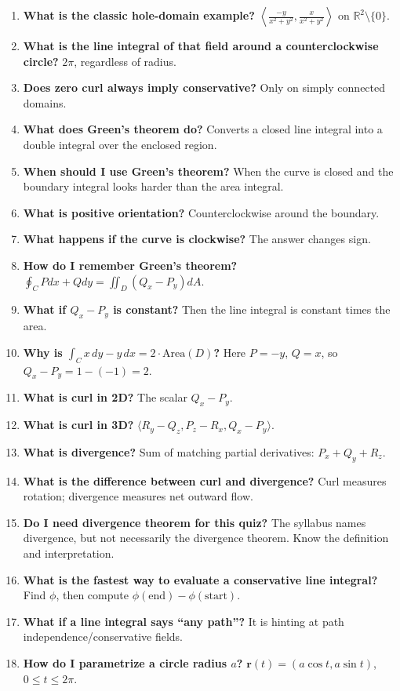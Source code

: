 \documentclass[11pt]{article}
\newcommand{\R}{\mathbb{R}}
\begin{document}
\begin{enumerate}
\item \textbf{What is the classic hole-domain example?} $\left\langle \frac{-y}{x^2+y^2},\frac{x}{x^2+y^2}\right\rangle$ on $\R^2\setminus\{0\}$.
\item \textbf{What is the line integral of that field around a counterclockwise circle?} $2\pi$, regardless of radius.
\item \textbf{Does zero curl always imply conservative?} Only on simply connected domains.
\item \textbf{What does Green's theorem do?} Converts a closed line integral into a double integral over the enclosed region.
\item \textbf{When should I use Green's theorem?} When the curve is closed and the boundary integral looks harder than the area integral.
\item \textbf{What is positive orientation?} Counterclockwise around the boundary.
\item \textbf{What happens if the curve is clockwise?} The answer changes sign.
\item \textbf{How do I remember Green's theorem?} $\oint_C Pdx+Qdy=\iint_D(Q_x-P_y)dA$.
\item \textbf{What if $Q_x-P_y$ is constant?} Then the line integral is constant times the area.
\item \textbf{Why is $\int_C x\,dy-y\,dx=2\cdot\text{Area}(D)$?} Here $P=-y$, $Q=x$, so $Q_x-P_y=1-(-1)=2$.
\item \textbf{What is curl in 2D?} The scalar $Q_x-P_y$.
\item \textbf{What is curl in 3D?} $\langle R_y-Q_z,P_z-R_x,Q_x-P_y\rangle$.
\item \textbf{What is divergence?} Sum of matching partial derivatives: $P_x+Q_y+R_z$.
\item \textbf{What is the difference between curl and divergence?} Curl measures rotation; divergence measures net outward flow.
\item \textbf{Do I need divergence theorem for this quiz?} The syllabus names divergence, but not necessarily the divergence theorem. Know the definition and interpretation.
\item \textbf{What is the fastest way to evaluate a conservative line integral?} Find $\phi$, then compute $\phi(\text{end})-\phi(\text{start})$.
\item \textbf{What if a line integral says ``any path''?} It is hinting at path independence/conservative fields.
\item \textbf{How do I parametrize a circle radius $a$?} $\mathbf r(t)=(a\cos t,a\sin t)$, $0\le t\le2\pi$.

\end{enumerate}
\end{document}
